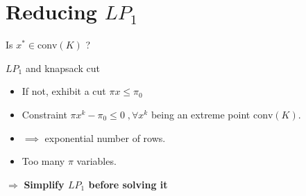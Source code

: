 \documentclass[aspectratio=169,xcolor=dvipsnames]{beamer}
\begin{document}
\section{Reducing $LP_1$}

\begin{frame}{Is $x^* \in \text{conv}(K)$ ?}

	\begin{block}{$LP_1$ and knapsack cut}
		\begin{itemize}
			\item If not, exhibit a cut $\pi x \leq \pi_0$ 
			\item Constraint $ \pi x^k - \pi_0 \leq 0 \; , \forall x^k$ being an extreme point $\text{conv}(K)$.
			\item $\implies $ exponential number of rows.
			\item Too many $\pi$ variables.
		\end{itemize}
	\end{block}
	
	\begin{center}
		$\Rightarrow$ \textbf{Simplify $LP_1$ before solving it}
	\end{center}
\end{frame}
\end{document}

